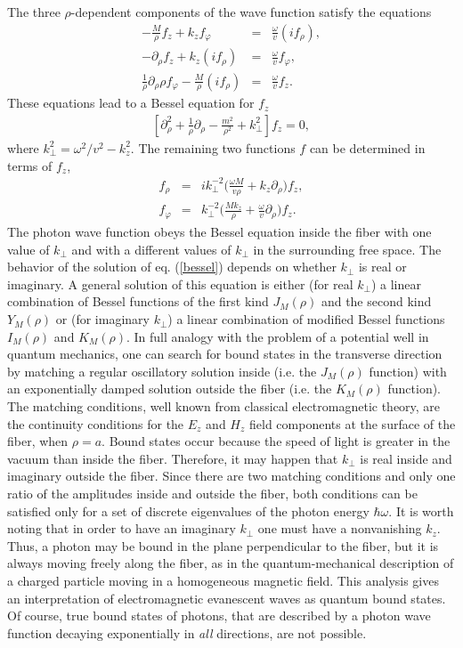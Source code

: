 \documentclass{article}
\begin{document}
The three $\rho$-dependent components of the wave function satisfy the
equations
\begin{eqnarray}
-\frac{M}{\rho}f_z + k_z f_{\varphi} &=&
\frac{\omega}{v}(if_{\rho}),\label{cyl1}\\
-\partial_{\rho} f_z + k_z (if_{\rho}) &=&
\frac{\omega}{v}f_{\varphi},\label{cyl2}\\
\frac{1}{\rho}\partial_{\rho}\rho f_{\varphi} -
\frac{M}{\rho}(if_{\rho}) &=& \frac{\omega}{v}f_z.\label{cyl3}
\end{eqnarray}
These equations lead to a Bessel equation for $f_z$
\begin{eqnarray}
\left[\partial_{\rho}^2 + \frac{1}{\rho}\partial_{\rho} -
\frac{m^2}{\rho^2} + k_{\perp}^2\right]f_z = 0,\label{bessel}
\end{eqnarray}
where $k_{\perp}^2 = \omega^2/v^2 - k_z^2$. The remaining two functions $f$
can be determined in terms of $f_z$,
\begin{eqnarray}
 f_{\rho}
 &=& ik^{-2}_{\perp}\big(\frac{\omega M}{v\rho}
 + k_z\partial_{\rho}\big)f_z,\\
 f_{\varphi}
 &=& k^{-2}_{\perp}\big(\frac{M k_z}{\rho}
 + \frac{\omega}{v}\partial_{\rho}\big)f_z.
\end{eqnarray}
The photon wave function obeys the Bessel equation inside the fiber with one
value of $k_{\perp}$ and with a different values of $k_{\perp}$ in the surrounding free space. The behavior of the solution of eq. (\ref{bessel})
depends on whether $k_{\perp}$ is real or imaginary. A general solution of
this equation is either (for real $k_{\perp}$) a linear combination of Bessel functions of the first kind $J_M(\rho)$ and the second kind $Y_M(\rho)$ or
(for imaginary $k_{\perp}$) a linear combination of modified Bessel functions $I_M(\rho)$ and $K_M(\rho)$. In full analogy with the problem of a potential well in quantum mechanics, one can search for bound states in the transverse direction by matching a regular oscillatory solution inside (i.e. the $J_M(\rho)$ function) with an exponentially damped solution outside the fiber (i.e. the $K_M(\rho)$ function). The matching conditions, well known from classical electromagnetic theory, are the continuity conditions for the $E_z$ and $H_z$ field components at the surface of the fiber, when $\rho = a$. Bound states occur because the speed of light is greater in the vacuum than inside the fiber. Therefore, it may happen that $k_{\perp}$ is real inside and imaginary outside the fiber. Since there are two matching conditions and only one ratio of the amplitudes inside and outside the fiber, both conditions can be satisfied only for a set of discrete eigenvalues of the photon energy $\hbar\omega$. It is worth noting that in order to have an imaginary $k_{\perp}$ one must have a nonvanishing $k_z$. Thus, a photon may be bound in the plane perpendicular to the fiber, but it is always moving freely along the fiber, as in the quantum-mechanical description of a charged particle moving in a homogeneous magnetic field. This analysis gives an interpretation of electromagnetic evanescent waves as quantum bound states. Of course, true bound states of photons, that are described by a photon wave function decaying exponentially in {\em all} directions, are not possible.
\end{document}

